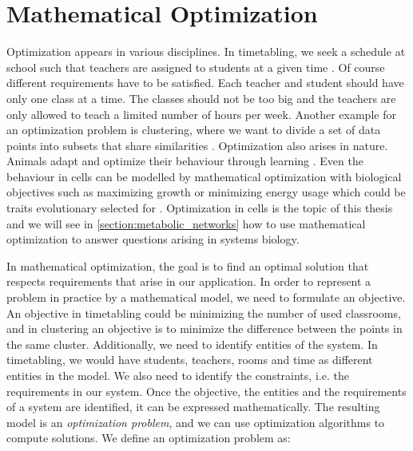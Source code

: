 \thispagestyle{plain}
\section{Mathematical Optimization} \label{section:optimization}
Optimization appears in various disciplines. 
In timetabling, we seek a schedule at school such that teachers are assigned to students at a given time \cite{timetabling}. Of course different requirements have to be satisfied. Each teacher and student should have only one class at a time. The classes should not be too big and the teachers are only allowed to teach a limited number of hours per week. 
Another example for an optimization problem is clustering, where we want to divide a set of data points into subsets that share similarities \cite{clustering}. 
Optimization also arises in nature. Animals adapt and optimize their behaviour through learning \cite{optimization_systems_biology}.
Even the behaviour in cells can be modelled by mathematical optimization with biological objectives such as maximizing growth or minimizing energy usage which could be traits evolutionary selected for \cite{intro_computational_systems_biology}. Optimization in cells is the topic of this thesis and we will see in \cref{section:metabolic_networks} how to use mathematical optimization to answer questions arising in systems biology.

In mathematical optimization, the goal is to find an optimal solution that respects requirements that arise in our application. In order to represent a problem in practice by a mathematical model, we need to formulate an objective. An objective in timetabling could be minimizing the number of used classrooms, and in clustering an objective is to minimize the difference between the points in the same cluster. Additionally, we need to identify entities of the system. In timetabling, we would have students, teachers, rooms and time as different entities in the model. We also need to identify the constraints, i.e. the requirements in our system. Once the objective, the entities and the requirements of a system are identified, it can be expressed mathematically.
The resulting model is an \textit{optimization problem}, and we can use optimization algorithms to compute solutions. 
We define an optimization problem as:

